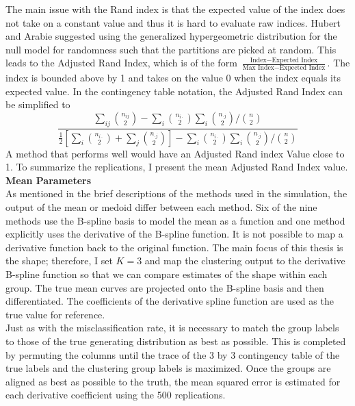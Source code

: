 \documentclass[12pt]{article}
\begin{document}
The main issue with the Rand index is that the expected value of the index does not take on a constant value and thus it is hard to evaluate raw indices. Hubert and Arabie suggested using the generalized hypergeometric distribution for the null model for randomness such that the partitions are picked at random. This leads to the Adjusted Rand Index, which is of the form $\frac{\text{Index} - \text{Expected Index}}{\text{Max Index}-\text{Expected Index}}$. The index is bounded above by 1 and takes on the value 0 when the index equals its expected value. In the contingency table notation, the Adjusted Rand Index can be simplified to
$$\frac{\sum_{ij}{n_{ij} \choose 2} - \sum_{i} {n_{i\cdot} \choose 2} \sum_{i} {n_{\cdot j} \choose 2} / {n \choose 2}}{\frac{1}{2}\left[\sum_{i}{n_{i\cdot} \choose 2}+\sum_{j}{n_{\cdot j} \choose 2}\right] - \sum_{i} {n_{i\cdot} \choose 2} \sum_{i} {n_{\cdot j} \choose 2} / {n \choose 2}}$$
A method that performs well would have an Adjusted Rand index Value close to 1. To summarize the replications, I present the mean Adjusted Rand Index value.\\

\textbf{Mean Parameters}\\
As mentioned in the brief descriptions of the methods used in the simulation, the output of the mean or medoid differ between each method. Six of the nine methods use the B-spline basis to model the mean as a function and one method explicitly uses the derivative of the B-spline function. It is not possible to map a derivative function back to the original function. The main focus of this thesis is the shape; therefore, I set $K=3$ and map the clustering output to the derivative B-spline function so that we can compare estimates of the shape within each group. The true mean curves are projected onto the B-spline basis and then differentiated. The coefficients of the derivative spline function are used as the true value for reference. \\

Just as with the misclassification rate, it is necessary to match the group labels to those of the true generating distribution as best as possible. This is completed by permuting the columns until the trace of the 3 by 3 contingency table of the true labels and the clustering group labels is maximized. Once the groups are aligned as best as possible to the truth, the mean squared error is estimated for each derivative coefficient using the 500 replications.\\
\end{document}
